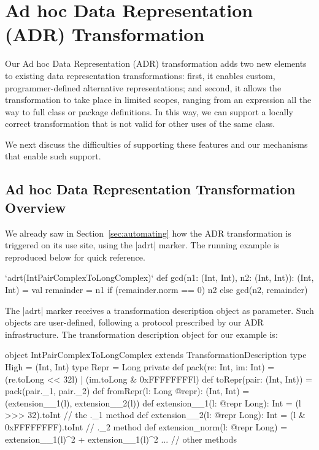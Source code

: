 \section{Ad hoc Data Representation (ADR) Transformation}
\label{sec:ildl}

Our Ad hoc Data Representation (ADR) transformation adds two new
elements to existing data representation transformations: first, it
enables custom, programmer-defined alternative representations; and
second, it allows the transformation to take place in limited scopes,
ranging from an expression all the way to full class or package
definitions. In this way, we can support a locally correct
transformation that is not valid for other uses of the same class.

We next discuss the difficulties of supporting these features and
our mechanisms that enable such support.


\subsection{Ad hoc Data Representation Transformation Overview}
\label{sec:ildl:user-story}

We already saw in Section~\ref{sec:automating} how the ADR
transformation is triggered on its use site, using the |adrt|
marker. The running example is reproduced below for quick
reference.

\begin{lstlisting-nobreak}
`adrt(IntPairComplexToLongComplex)` {
  def gcd(n1: (Int, Int), n2: (Int, Int)): (Int, Int) = {
    val remainder = n1 %
    if (remainder.norm == 0) n2 else gcd(n2, remainder)
  }
}
\end{lstlisting-nobreak}

The |adrt| marker receives a transformation description object
as parameter. Such objects are user-defined, following a
protocol prescribed by our ADR infrastructure. The 
transformation description object for our example is:

\begin{lstlisting-nobreak}
object IntPairComplexToLongComplex extends TransformationDescription {
  type High = (Int, Int)
  type Repr = Long
  private def pack(re: Int, im: Int) = (re.toLong << 32l) | (im.toLong & 0xFFFFFFFFl)
  def toRepr(pair: (Int, Int)) = pack(pair._1, pair._2)
  def fromRepr(l: Long @repr): (Int, Int) = (extension__1(l), extension__2(l))
  def extension__1(l: @repr Long): Int = (l >>> 32).toInt        // the ._1 method
  def extension__2(l: @repr Long): Int = (l & 0xFFFFFFFF).toInt  // ._2 method
  def extension_norm(l: @repr Long) = extension__1(l)^2 + extension__1(l)^2
  ... // other methods
}
\end{lstlisting-nobreak}

